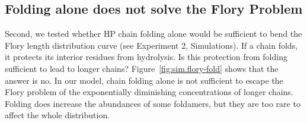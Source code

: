 \documentclass[journal=jacsat,manuscript=article,layout=twocolumn]{achemso}
\begin{document}
\subsection{Folding alone does not solve the Flory Problem}
 Second, we tested whether HP chain folding alone would be sufficient to bend the Flory length 
distribution curve (see Experiment 2, Simulations).  If a chain folds, it protects its interior 
residues from 
hydrolysis.  Is this protection from folding sufficient to lead to longer chains?  
Figure~\ref{fig:sim.flory-fold} shows that the answer is no.  In our model, chain folding alone is 
not sufficient to escape the Flory problem of the exponentially diminishing concentrations of longer 
chains.  Folding does increase the abundances of some foldamers, but they are too rare to affect the 
whole distribution.
 
\end{document}
